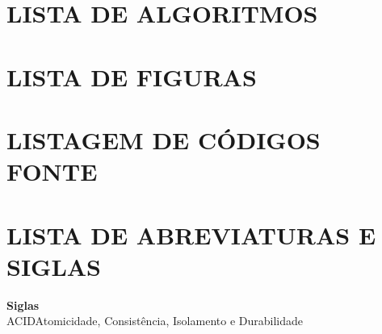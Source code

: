 \section*{\centering \small\bfseries LISTA DE ALGORITMOS}

\newpage
\section*{\centering \small\bfseries LISTA DE FIGURAS}

\newpage
\section*{\centering \small\bfseries LISTAGEM DE CÓDIGOS FONTE}

\newpage
\section*{\centering \small\bfseries LISTA DE ABREVIATURAS E SIGLAS}
\textbf{Siglas}\\

\noindent
ACID\hspace{1cm}Atomicidade, Consistência, Isolamento e Durabilidade
\clearpage

\renewcommand{\cftdotsep}{1}

\renewcommand{\contentsname}{\MakeUppercase{Sumário}}
\renewcommand{\cfttoctitlefont}{\bfseries\small} %
\renewcommand{\cftaftertoctitle}{\hfill\par}           %
\renewcommand{\cftchapfont}{\bfseries}
\renewcommand{\cftchappagefont}{\bfseries}

\renewcommand{\cftsecfont}{\bfseries}
\renewcommand{\cftsecpagefont}{\bfseries}

\renewcommand{\cftsubsecfont}{\bfseries}
\renewcommand{\cftsubsecpagefont}{\bfseries}

\setlength{\cftbeforetoctitleskip}{0pt}
\setlength{\cftaftertoctitleskip}{2ex}


\setcounter{tocdepth}{2}
\tableofcontents
\newpage

